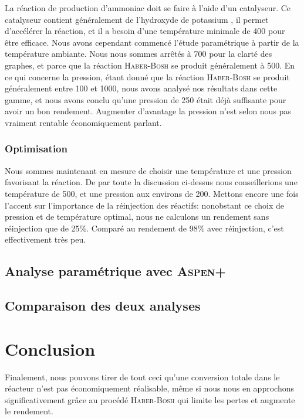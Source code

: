 La réaction de production d'ammoniac doit se faire à l'aide d'un catalyseur. Ce catalyseur contient généralement de
l'hydroxyde de potassium , il permet d'accélérer la réaction, et il a besoin d'une température minimale de \unit{400}{\celsius}
pour être efficace. Nous avons cependant commencé l'étude paramétrique à partir de la température ambiante. Nous nous sommes
arrêtés à \unit{700}{\celsius} pour la clarté des graphes, et parce que la réaction \textsc{Haber-Bosh} se produit généralement à \unit{500}{\celsius}.
En ce qui concerne la pression, étant donné que la réaction \textsc{Haber-Bosh} se produit généralement entre \unit{100}{\bbar} et \unit{1000}{\bbar},
nous avons analysé nos résultats dans cette gamme, et nous avons conclu qu'une pression de \unit{250}{\bbar} était déjà
suffisante pour avoir un bon rendement. Augmenter d'avantage la pression n'est selon nous pas vraiment rentable économiquement parlant.


\subsection{Optimisation}
Nous sommes maintenant en mesure de choisir une température et une pression favorisant la réaction. De par
toute la discussion ci-dessus nous conseillerions une température de \unit{500}{\celsius}, et une pression aux environs de \unit{200}{\bbar}. Mettons encore une fois l'accent sur l'importance de la réinjection des réactifs: nonobstant ce choix de pression et de température optimal, nous ne calculons un rendement sans réinjection que de 25\%. Comparé au rendement de 98\% avec réinjection, c'est effectivement très peu.


\section{Analyse paramétrique avec \textsc{Aspen+}}
\section{Comparaison des deux analyses}

\chapter{Conclusion} Finalement, nous pouvons tirer de tout ceci qu'une conversion totale dans le réacteur n'est
pas économiquement réalisable, même si nous nous en approchons significativement grâce au procédé \textsc{Haber-Bosh} qui limite les pertes et augmente le rendement.


